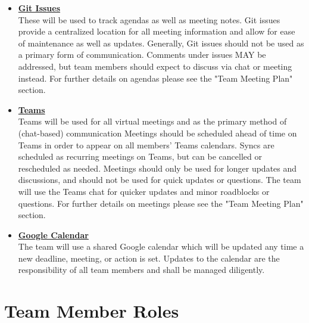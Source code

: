 \documentclass{article}
\begin{document}
\begin{itemize}
	\item \textbf{\underline{Git Issues}} \\
	These will be used to track agendas as well as meeting notes. 
	Git issues provide a centralized location for all meeting information and allow for ease of maintenance as well as updates. 
	Generally, Git issues should not be used as a primary form of communication.
	 Comments under issues MAY be addressed, but team members should expect to discuss via chat or meeting instead.
	For further details on agendas please see the "Team Meeting Plan" section.\\
	\item \textbf{\underline{Teams}} \\
	Teams will be used for all virtual meetings and as the primary method of (chat-based) communication 
	Meetings should be scheduled ahead of time on Teams in order to appear on all members' Teams calendars.
	Syncs are scheduled as recurring meetings on Teams, but can be cancelled or rescheduled as needed.
	Meetings should only be used for longer updates and discussions, and should not be used for quick updates or questions.
	The team will use the Teams chat for quicker updates and minor roadblocks or questions.
	For further details on meetings please see the "Team Meeting Plan" section. \\
	\item \textbf{\underline{Google Calendar}} \\
	The team will use a shared Google calendar which will be updated any time a new deadline, meeting, or action is set. 
	Updates to the calendar are the responsibility of all team members and shall be managed diligently. \\
\end{itemize}



\section{Team Member Roles}
\end{document}
